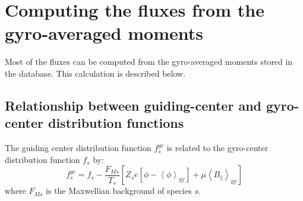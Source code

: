 \documentclass[a4paper]{report}
\begin{document}
\section{Computing the fluxes from the gyro-averaged moments}
Most of the fluxes can be computed from the gyro-averaged moments stored in the database. This calculation is described below.

\subsection{Relationship between guiding-center and gyro-center distribution functions} \label{sec:gctogy}
The guiding center distribution function $f_s^{gc}$ is related to the gyro-center distribution function $f_s$ by:
$$f_s^{gc} = f_s - \frac{F_{Ms}}{T_s}\left[ Z_s e [\phi - \left< \phi \right>_\textrm{gy}]+\mu\left< B_\parallel \right>_\textrm{gy}\right]$$
where $F_{Ms}$ is the Maxwellian background of species $s$.\\
\end{document}
